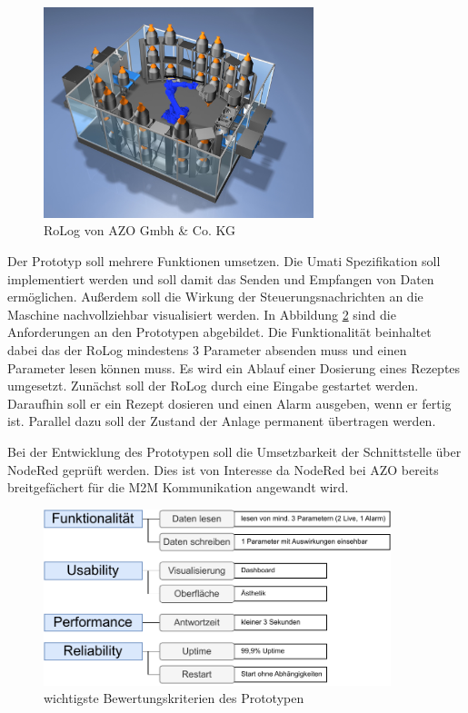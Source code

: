 \documentclass[a4paper, 12pt, oneside]{scrbook}
\begin{document}
		\begin{figure}[H]
			\centering
			\includegraphics[width=0.7\textwidth]{res/RoLog.png}
			\caption{RoLog von AZO Gmbh \& Co. KG \cite{noauthor_azo_nodate}}
			\label{fig:RoLog}
		\end{figure}
		
		Der Prototyp soll mehrere Funktionen umsetzen. Die Umati Spezifikation soll implementiert werden und soll damit das Senden und Empfangen von Daten ermöglichen. Außerdem soll die Wirkung der Steuerungsnachrichten an die Maschine nachvollziehbar visualisiert werden. In Abbildung \ref{fig:evaluation} sind die Anforderungen an den Prototypen abgebildet. Die Funktionalität beinhaltet dabei das der RoLog mindestens 3 Parameter absenden muss und einen Parameter lesen können muss. Es wird ein Ablauf einer Dosierung eines Rezeptes umgesetzt. Zunächst soll der RoLog durch eine Eingabe gestartet werden. Daraufhin soll er ein Rezept dosieren und einen Alarm ausgeben, wenn er fertig ist. Parallel dazu soll der Zustand der Anlage permanent übertragen werden. %
		
		Bei der Entwicklung des Prototypen soll die Umsetzbarkeit der Schnittstelle über NodeRed geprüft werden. Dies ist von Interesse da NodeRed bei AZO bereits breitgefächert für die M2M Kommunikation angewandt wird. %
		
		\begin{figure}[H]
			\centering
			\includegraphics[width=0.9\textwidth]{res/analysen/Evaluation.pdf}
			\caption{wichtigste Bewertungskriterien des Prototypen}
			\label{fig:evaluation}
		\end{figure}
		
\end{document}
